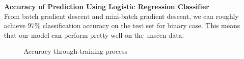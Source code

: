 \documentclass{article} %
\begin{document}
\textbf{Accuracy of Prediction Using Logistic Regression Classifier}\\
From batch gradient descent and mini-batch gradient descent, we can roughly achieve $97\%$ classification accuracy on the test set for binary case. This means that our model can perform pretty well on the unseen data.

\begin{figure}%
	\centering
	\qquad
	\caption{Accuracy through training process}%
	\label{fig:P3}%
\end{figure}
\end{document}
